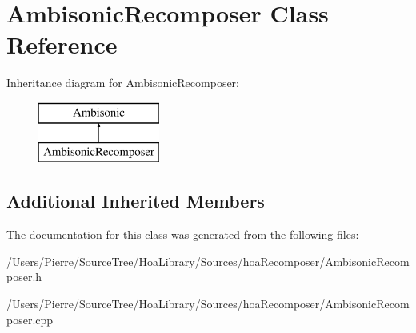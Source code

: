 \hypertarget{class_ambisonic_recomposer}{\section{Ambisonic\-Recomposer Class Reference}
\label{class_ambisonic_recomposer}
}
Inheritance diagram for Ambisonic\-Recomposer\-:\begin{figure}[H]
\begin{center}
\leavevmode
\includegraphics[height=2.000000cm]{class_ambisonic_recomposer}
\end{center}
\end{figure}
\subsection*{Additional Inherited Members}


The documentation for this class was generated from the following files\-:\begin{DoxyCompactItemize}
\item 
/\-Users/\-Pierre/\-Source\-Tree/\-Hoa\-Library/\-Sources/hoa\-Recomposer/Ambisonic\-Recomposer.\-h\item 
/\-Users/\-Pierre/\-Source\-Tree/\-Hoa\-Library/\-Sources/hoa\-Recomposer/Ambisonic\-Recomposer.\-cpp\end{DoxyCompactItemize}
